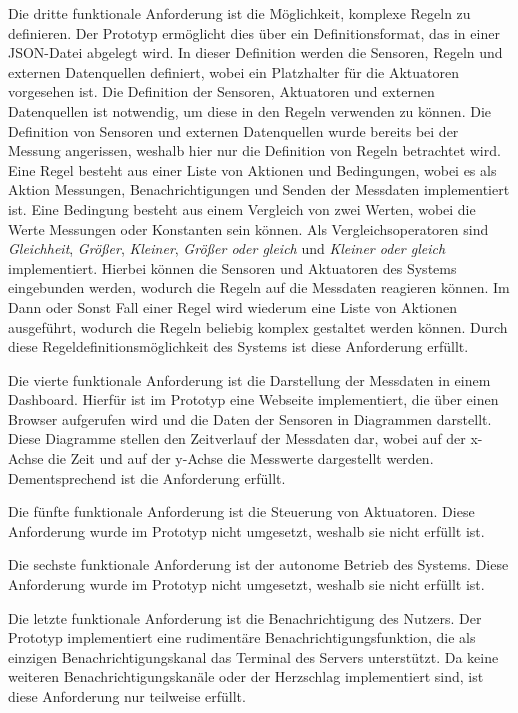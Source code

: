 Die dritte funktionale Anforderung ist die Möglichkeit, komplexe Regeln zu definieren.
Der Prototyp ermöglicht dies über ein Definitionsformat, das in einer JSON-Datei abgelegt wird.
In dieser Definition werden die Sensoren, Regeln und externen Datenquellen definiert, wobei ein Platzhalter für die Aktuatoren vorgesehen ist.
Die Definition der Sensoren, Aktuatoren und externen Datenquellen ist notwendig, um diese in den Regeln verwenden zu können.
Die Definition von Sensoren und externen Datenquellen wurde bereits bei der Messung angerissen, weshalb hier nur die Definition von Regeln betrachtet wird.
Eine Regel besteht aus einer Liste von Aktionen und Bedingungen, wobei es als Aktion Messungen, Benachrichtigungen und Senden der Messdaten implementiert ist.
Eine Bedingung besteht aus einem Vergleich von zwei Werten, wobei die Werte Messungen oder Konstanten sein können.
Als Vergleichsoperatoren sind \emph{Gleichheit}, \emph{Größer}, \emph{Kleiner}, \emph{Größer oder gleich} und \emph{Kleiner oder gleich} implementiert.
Hierbei können die Sensoren und Aktuatoren des Systems eingebunden werden, wodurch die Regeln auf die Messdaten reagieren können.
Im Dann oder Sonst Fall einer Regel wird wiederum eine Liste von Aktionen ausgeführt, wodurch die Regeln beliebig komplex gestaltet werden können.
Durch diese Regeldefinitionsmöglichkeit des Systems ist diese Anforderung erfüllt.

Die vierte funktionale Anforderung ist die Darstellung der Messdaten in einem Dashboard.
Hierfür ist im Prototyp eine Webseite implementiert, die über einen Browser aufgerufen wird und die Daten der Sensoren in Diagrammen darstellt.
Diese Diagramme stellen den Zeitverlauf der Messdaten dar, wobei auf der x-Achse die Zeit und auf der y-Achse die Messwerte dargestellt werden.
Dementsprechend ist die Anforderung erfüllt.

Die fünfte funktionale Anforderung ist die Steuerung von Aktuatoren.
Diese Anforderung wurde im Prototyp nicht umgesetzt, weshalb sie nicht erfüllt ist.

Die sechste funktionale Anforderung ist der autonome Betrieb des Systems.
Diese Anforderung wurde im Prototyp nicht umgesetzt, weshalb sie nicht erfüllt ist.

Die letzte funktionale Anforderung ist die Benachrichtigung des Nutzers.
Der Prototyp implementiert eine rudimentäre Benachrichtigungsfunktion, die als einzigen Benachrichtigungskanal das Terminal des Servers unterstützt.
Da keine weiteren Benachrichtigungskanäle oder der Herzschlag implementiert sind, ist diese Anforderung nur teilweise erfüllt.

